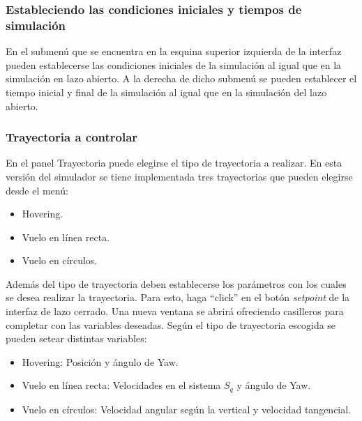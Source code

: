 \documentclass[main]{subfiles}
\begin{document}
\subsubsection*{Estableciendo las condiciones iniciales y tiempos de simulaci\'on}
En el submen\'u que se encuentra en la esquina superior izquierda de la interfaz pueden establecerse las condiciones iniciales de la simulaci\'on al igual que en la simulaci\'on en lazo abierto. A la derecha de dicho submen\'u se pueden establecer el tiempo inicial y final de la simulaci\'on al igual que en la simulaci\'on del lazo abierto.

\subsubsection*{Trayectoria a controlar}
En el panel Trayectoria puede elegirse el tipo de trayectoria a realizar. En esta versi\'on del simulador se tiene implementada tres trayectorias que pueden elegirse desde el men\'u:
\begin{itemize}
\item Hovering.
\item Vuelo en l\'inea recta.
\item Vuelo en c\'irculos.
\end{itemize}

Adem\'as del tipo de trayectoria deben establecerse los par\'ametros con los cuales se desea realizar la trayectoria. Para esto, haga ``click'' en el bot\'on \emph{setpoint} de la interfaz de lazo cerrado. Una nueva ventana se abrir\'a ofreciendo casilleros para completar con las variables deseadas. Seg\'un el tipo de trayectoria escogida se pueden setear distintas variables:
\begin{itemize}
\item Hovering: Posici\'on y \'angulo de Yaw.
\item Vuelo en l\'inea recta: Velocidades en el sistema $S_q$ y \'angulo de Yaw.
\item Vuelo en c\'irculos: Velocidad angular seg\'un la vertical y velocidad tangencial.
\end{itemize}
\end{document}
